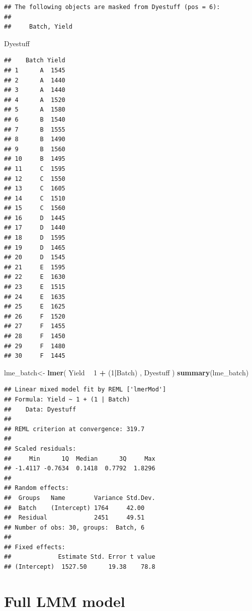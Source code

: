 \documentclass[]{book}
\newenvironment{Shaded}{\begin{snugshade}}{\end{snugshade}}
\newcommand{\KeywordTok}[1]{\textcolor[rgb]{0.13,0.29,0.53}{\textbf{#1}}}
\newcommand{\DecValTok}[1]{\textcolor[rgb]{0.00,0.00,0.81}{#1}}
\newcommand{\StringTok}[1]{\textcolor[rgb]{0.31,0.60,0.02}{#1}}
\newcommand{\OperatorTok}[1]{\textcolor[rgb]{0.81,0.36,0.00}{\textbf{#1}}}
\newcommand{\NormalTok}[1]{#1}
\begin{document}
\begin{verbatim}
## The following objects are masked from Dyestuff (pos = 6):
## 
##     Batch, Yield
\end{verbatim}

\begin{Shaded}
\begin{Highlighting}[]
\NormalTok{Dyestuff}
\end{Highlighting}
\end{Shaded}

\begin{verbatim}
##    Batch Yield
## 1      A  1545
## 2      A  1440
## 3      A  1440
## 4      A  1520
## 5      A  1580
## 6      B  1540
## 7      B  1555
## 8      B  1490
## 9      B  1560
## 10     B  1495
## 11     C  1595
## 12     C  1550
## 13     C  1605
## 14     C  1510
## 15     C  1560
## 16     D  1445
## 17     D  1440
## 18     D  1595
## 19     D  1465
## 20     D  1545
## 21     E  1595
## 22     E  1630
## 23     E  1515
## 24     E  1635
## 25     E  1625
## 26     F  1520
## 27     F  1455
## 28     F  1450
## 29     F  1480
## 30     F  1445
\end{verbatim}

\begin{Shaded}
\begin{Highlighting}[]
\NormalTok{lme_batch<-}\StringTok{ }\KeywordTok{lmer}\NormalTok{( Yield }\OperatorTok{~}\StringTok{ }\DecValTok{1} \OperatorTok{+}\StringTok{ }\NormalTok{(}\DecValTok{1}\OperatorTok{|}\NormalTok{Batch)  , Dyestuff )}
\KeywordTok{summary}\NormalTok{(lme_batch)}
\end{Highlighting}
\end{Shaded}

\begin{verbatim}
## Linear mixed model fit by REML ['lmerMod']
## Formula: Yield ~ 1 + (1 | Batch)
##    Data: Dyestuff
## 
## REML criterion at convergence: 319.7
## 
## Scaled residuals: 
##     Min      1Q  Median      3Q     Max 
## -1.4117 -0.7634  0.1418  0.7792  1.8296 
## 
## Random effects:
##  Groups   Name        Variance Std.Dev.
##  Batch    (Intercept) 1764     42.00   
##  Residual             2451     49.51   
## Number of obs: 30, groups:  Batch, 6
## 
## Fixed effects:
##             Estimate Std. Error t value
## (Intercept)  1527.50      19.38    78.8
\end{verbatim}

\section{Full LMM model}\label{full-lmm-model}
\end{document}

